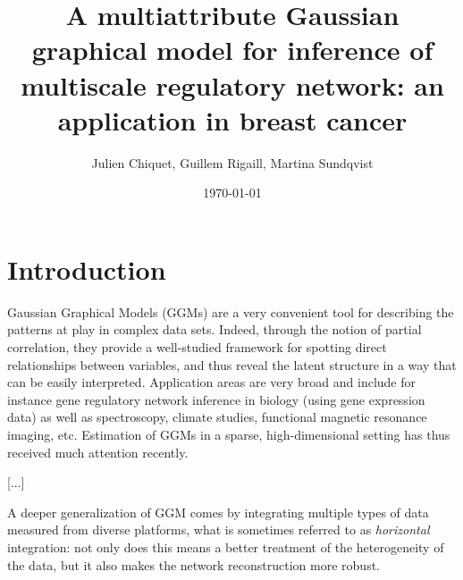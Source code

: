 \documentclass[graybox]{svmult}
\title{A multiattribute Gaussian graphical model for inference of
  multiscale regulatory network: an application in breast cancer}
\date{\today}
\author{Julien Chiquet, Guillem Rigaill, Martina Sundqvist}
\begin{document}
\maketitle

\section{Introduction}


Gaussian Graphical Models (GGMs)
\cite{1996_Book_Lauritzen,whittaker1990graphical} are a very
convenient tool for describing the patterns at play in complex data
sets.  Indeed, through the notion of partial correlation, they provide
a well-studied framework for spotting direct relationships between
variables, and thus reveal the latent structure in a way that can be
easily interpreted. Application areas are very broad and include for
instance gene regulatory network inference in biology (using gene
expression data) as well as spectroscopy, climate studies, functional
magnetic resonance imaging, etc.  Estimation of GGMs in a sparse,
high-dimensional setting has thus received much attention recently.


[...]

A deeper generalization of GGM comes by integrating multiple types of
data measured from diverse platforms, what is sometimes referred to as
\emph{horizontal} integration: not only does this means a better
treatment of the heterogeneity of the data, but it also makes the
network reconstruction more robust.











\end{document}
